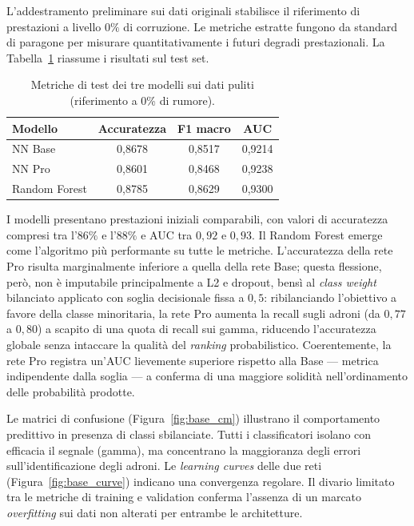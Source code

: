 \documentclass[12pt,a4paper]{article}
\begin{document}
L'addestramento preliminare sui dati originali stabilisce il riferimento di 
prestazioni a livello $0\%$ di corruzione. Le metriche estratte fungono da 
standard di paragone per misurare quantitativamente i futuri degradi prestazionali. 
La Tabella~\ref{tab:baseline} riassume i risultati sul test set.

\begin{table}[H]\centering\small
\caption{Metriche di test dei tre modelli sui dati puliti (riferimento a 0\% di rumore).}\label{tab:baseline}
\begin{tabular}{lccc}
\toprule
\textbf{Modello} & \textbf{Accuratezza} & \textbf{F1 macro} & \textbf{AUC} \\
\midrule
NN Base       & 0,8678 & 0,8517 & 0,9214 \\
NN Pro        & 0,8601 & 0,8468 & 0,9238 \\
Random Forest & 0,8785 & 0,8629 & 0,9300 \\
\bottomrule
\end{tabular}
\end{table}

I modelli presentano prestazioni iniziali comparabili, con valori di accuratezza
compresi tra l'$86\%$ e l'$88\%$ e AUC tra $0{,}92$ e $0{,}93$. Il Random Forest
emerge come l'algoritmo più performante su tutte le metriche. L'accuratezza della
rete Pro risulta marginalmente inferiore a quella della rete Base; questa
flessione, però, non è imputabile principalmente a L2 e dropout, bensì al
\emph{class weight} bilanciato applicato con soglia decisionale fissa a $0{,}5$:
ribilanciando l'obiettivo a favore della classe minoritaria, la rete Pro
aumenta la recall sugli adroni (da $0{,}77$ a $0{,}80$) a scapito di una quota
di recall sui gamma, riducendo l'accuratezza globale senza intaccare la qualità
del \textit{ranking} probabilistico. Coerentemente, la rete Pro registra un'AUC
lievemente superiore rispetto alla Base — metrica indipendente dalla soglia — a
conferma di una maggiore solidità nell'ordinamento delle probabilità prodotte.

Le matrici di confusione (Figura~\ref{fig:base_cm}) illustrano il comportamento 
predittivo in presenza di classi sbilanciate. Tutti i classificatori isolano con 
efficacia il segnale (gamma), ma concentrano la maggioranza degli errori 
sull'identificazione degli adroni. Le \textit{learning curves} delle due reti 
(Figura~\ref{fig:base_curve}) indicano una convergenza regolare. Il divario 
limitato tra le metriche di training e validation conferma l'assenza di un marcato 
\textit{overfitting} sui dati non alterati per entrambe le architetture.
\end{document}
